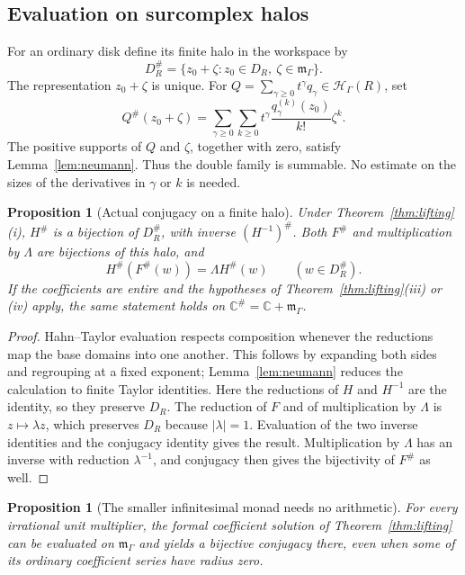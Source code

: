 \documentclass[11pt,a4paper]{article}
\numberwithin{equation}{section}
\newtheorem{proposition}[theorem]{Proposition}
\theoremstyle{definition}
\theoremstyle{remark}
\newcommand{\C}{\mathbb C}
\newcommand{\HH}{\mathcal H}
\newcommand{\mm}{\mathfrak m}
\begin{document}
\subsection{Evaluation on surcomplex halos}\label{subsec:halos}

For an ordinary disk define its finite halo in the workspace by
\[
 D_R^\#=\{z_0+\zeta:z_0\in D_R,\ \zeta\in\mm_\Gamma\}.
\]
The representation $z_0+\zeta$ is unique. For
$Q=\sum_{\gamma\ge0}t^\gamma q_\gamma\in\HH_\Gamma(R)$, set
\begin{equation}\label{eq:haloeval}
 Q^\#(z_0+\zeta)=
 \sum_{\gamma\ge0}\sum_{k\ge0}
 t^\gamma\frac{q_\gamma^{(k)}(z_0)}{k!}\zeta^k.
\end{equation}
The positive supports of $Q$ and $\zeta$, together with zero, satisfy
Lemma~\ref{lem:neumann}. Thus the double family is summable. No estimate
on the sizes of the derivatives in $\gamma$ or $k$ is needed.

\begin{proposition}[Actual conjugacy on a finite halo]\label{prop:halo}
Under Theorem~\ref{thm:lifting}(i), $H^\#$ is a bijection of $D_R^\#$,
with inverse $(H^{-1})^\#$. Both $F^\#$ and multiplication by $\Lambda$
are bijections of this halo, and
\[
 H^\#\!\left(F^\#(w)\right)=\Lambda H^\#(w)
       \qquad(w\in D_R^\#).
\]
If the coefficients are entire and the hypotheses of
Theorem~\ref{thm:lifting}(iii) or (iv) apply, the same statement holds on
$\C^\#=\C+\mm_\Gamma$.
\end{proposition}

\begin{proof}
Hahn--Taylor evaluation respects composition whenever the reductions map
the base domains into one another. This follows by expanding both sides
and regrouping at a fixed exponent; Lemma~\ref{lem:neumann} reduces the
calculation to finite Taylor identities. Here the reductions of $H$ and
$H^{-1}$ are the identity, so they preserve $D_R$. The reduction of $F$
and of multiplication by $\Lambda$ is $z\mapsto\lambda z$, which preserves
$D_R$ because $|\lambda|=1$. Evaluation of the two inverse identities and
the conjugacy identity gives the result. Multiplication by $\Lambda$ has
an inverse with reduction $\lambda^{-1}$, and conjugacy then gives the
bijectivity of $F^\#$ as well.
\end{proof}

\begin{proposition}[The smaller infinitesimal monad needs no arithmetic]\label{prop:monad}
For every irrational unit multiplier, the formal coefficient solution of
Theorem~\ref{thm:lifting} can be evaluated on
$\mm_\Gamma$ and yields a bijective conjugacy there, even when some of its
ordinary coefficient series have radius zero.
\end{proposition}
\end{document}
